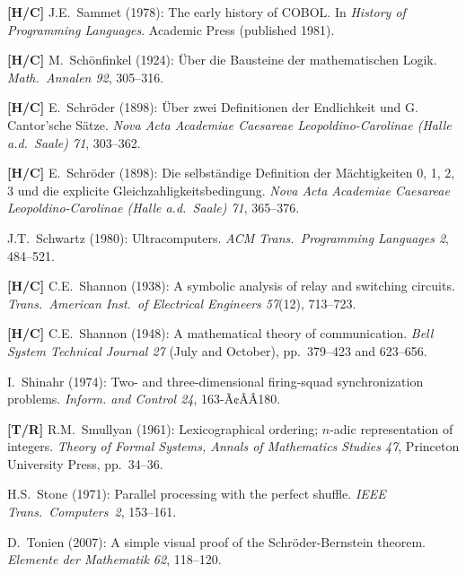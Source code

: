 \begin{thebibliography}{999}
{\bf [H/C]}
J.E.~Sammet (1978): The early history of COBOL.  In {\it History of Programming Languages}.  Academic Press (published 1981).

{\bf [H/C]}
M.~Sch\"onfinkel (1924): \"{U}ber die Bausteine der mathematischen Logik.  {\it Math.~Annalen 92}, 305--316.

{\bf [H/C]}
E.~Schr\"{o}der (1898): \"{U}ber zwei Definitionen der Endlichkeit und G. Cantor'sche S\"{a}tze.  {\it Nova Acta Academiae Caesareae Leopoldino-Carolinae (Halle a.d.~Saale) 71}, 303--362.

{\bf [H/C]}
E.~Schr\"{o}der (1898): Die selbst\"{a}ndige Definition der M\"{a}chtigkeiten 0, 1, 2, 3 und die explicite Gleichzahligkeitsbedingung.  {\it Nova Acta Academiae Caesareae
Leopoldino-Carolinae (Halle a.d.~Saale) 71}, 365--376.

J.T.~Schwartz (1980): Ultracomputers.  {\it ACM Trans.~Programming Languages 2}, 484--521.

{\bf [H/C]}
C.E.~Shannon (1938): A symbolic analysis of relay and switching circuits.  {\it Trans.~American Inst.~of Electrical Engineers 57}(12), 713--723.

{\bf [H/C]}
C.E.~Shannon (1948): A mathematical theory of communication.  {\it Bell System Technical Journal 27} (July and October), pp.~379--423 and 623--656.

I.~Shinahr (1974): Two- and three-dimensional firing-squad synchronization problems.  {\it Inform. and Control 24}, 163-Ã¢ÂÂ180.

{\bf [T/R]}
R.M.~Smullyan (1961):  Lexicographical ordering; $n$-adic representation of integers.  
{\it Theory of Formal Systems, Annals of Mathematics Studies 47}, Princeton University Press, pp.~34--36.

H.S.~Stone (1971): Parallel processing with the perfect shuffle.  {\it IEEE Trans.~Computers~2}, 153--161.




D.~Tonien (2007):  A simple visual proof of the Schr\"{o}der-Bernstein theorem.  {\it Elemente der Mathematik 62}, 118--120.


\end{thebibliography}
